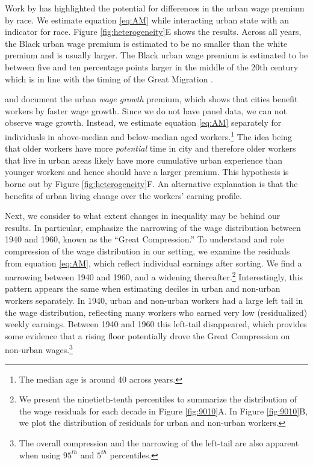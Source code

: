\documentclass[12pt]{article}
\begin{document}
Work by \citet*{ananat2018race} has highlighted the potential for differences in the urban wage premium by race. 
We estimate equation \eqref{eq:AM} while interacting urban state with an indicator for race.
Figure \ref{fig:heterogeneity}E shows the results. 
Across all years, the Black urban wage premium is estimated to be no smaller than the white premium and is usually larger.
The Black urban wage premium is estimated to be between five and ten percentage points larger in the middle of the 20th century which is in line with the timing of the Great Migration \citep{boustan2016competition,derenoncourt2022can}.

\citet*{BaumSnow_Pavan_2012} and \citet*{carlsen2016education} document the urban \emph{wage growth} premium, which shows that cities benefit workers by faster wage growth. 
Since we do not have panel data, we can not observe wage growth. 
Instead, we estimate equation \eqref{eq:AM} separately for individuals in above-median and below-median aged workers.\footnote{
  The median age is around 40 across years.
} 
The idea being that older workers have more \emph{potential} time in city and therefore older workers that live in urban areas likely have more cumulative urban experience than younger workers and hence should have a larger premium. 
This hypothesis is borne out by Figure \ref{fig:heterogeneity}F. 
An alternative explanation is that the benefits of urban living change over the workers' earning profile. 

Next, we consider to what extent changes in inequality may be behind our results. In particular, \cite{goldin1992great} emphasize the narrowing of the wage distribution between 1940 and 1960, known as the ``Great Compression.''
To understand and role compression of the wage distribution in our setting, we examine the residuals from equation \eqref{eq:AM}, which reflect individual earnings after sorting. 
We find a narrowing between 1940 and 1960, and a widening thereafter.\footnote{We present the ninetieth-tenth percentiles to summarize the distribution of the wage residuals for each decade in Figure \ref{fig:9010}A. 
In Figure \ref{fig:9010}B, we plot the distribution of residuals for urban and non-urban workers.
}
Interestingly, this pattern appears the same when estimating deciles in urban and non-urban workers separately. 
In 1940, urban and non-urban workers had a large left tail in the wage distribution, reflecting many workers who earned very low (residualized) weekly earnings.
Between 1940 and 1960 this left-tail disappeared, which provides some evidence that a rising floor potentially drove the Great Compression on non-urban wages.\footnote{
The overall compression and the narrowing of the left-tail are also apparent when using $95^{th}$ and $5^{th}$ percentiles.} 
\end{document}
